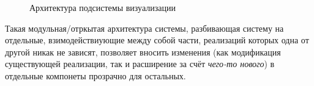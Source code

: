 \documentclass[a4paper,12pt]{extarticle}
\begin{document}
\begin{figure}[h]
    \caption{Архитектура подсистемы визуализации}
    \label{ris:architecture-all}
\end{figure}

Такая модульная/отркытая архитектура системы, разбивающая систему на отдельные, взимодействиующие между собой части, реализаций которых одна от другой никак не зависят, позволяет вносить изменения (как модификация существующей реализации, так и расширение за счёт \textit{чего-то нового}) в отдельные компонеты прозрачно для остальных.
\end{document}
